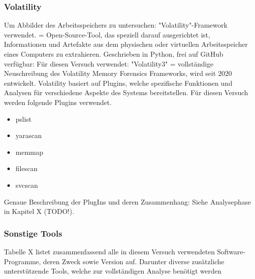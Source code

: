 \subsubsection*{Volatility}
Um Abbilder des Arbeitsspeichers zu untersuchen: "Volatility"-Framework verwendet.
= Open-Source-Tool, das speziell darauf ausgerichtet ist, Informationen und Artefakte aus dem physischen oder virtuellen Arbeitsspeicher eines Computers zu extrahieren.
Geschrieben in Python, frei auf GitHub verfügbar:	
Für diesen Versuch verwendet: "Volatility3"
= vollständige Neuschreibung des Volatility Memory Forensics Frameworks, wird seit 2020 entwickelt.
Volatility basiert auf Plugins, welche spezifische Funktionen und Analysen für verschiedene Aspekte des Systems bereitstellen. Für diesen Versuch werden folgende Plugins verwendet. 
\begin{itemize}
\item pslist	
\item yarascan		
\item memmap	 	
\item filescan
\item svcscan
\end{itemize}
Genaue Beschreibung der PlugIns und deren Zusammenhang: Siehe Analysephase in Kapitel X (TODO!).

\subsubsection*{Sonstige Tools}

Tabelle X listet zusammenfassend alle in diesem Versuch verwendeten Software-Programme, deren Zweck sowie Version auf.
Darunter diverse zusätzliche unterstützende Tools, welche zur vollständigen Analyse benötigt werden

